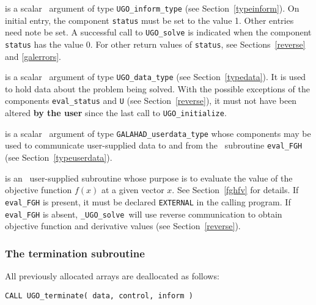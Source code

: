 \documentclass{galahad}
\newcommand{\packagename}{UGO}
\newcommand{\fullpackagename}{\libraryname\_\packagename}
\newcommand{\solver}{{\tt \fullpackagename\_solve}}
\begin{document}
\begin{description}
 is a scalar \intentinout\ argument of type
{\tt \packagename\_inform\_type}
(see Section~\ref{typeinform}).
On initial entry, the  component {\tt status} must be set to the value 1.
Other entries need note be set.
A successful call to
{\tt \packagename\_solve}
is indicated when the  component {\tt status} has the value 0.
For other return values of {\tt status}, see Sections~\ref{reverse} and
\ref{galerrors}.

 is a scalar \intentinout\ argument of type
{\tt \packagename\_data\_type}
(see Section~\ref{typedata}). It is used to hold data about the problem being
solved. With the possible exceptions of the components
{\tt eval\_status} and {\tt U} (see Section~\ref{reverse}),
it must not have been altered {\bf by the user} since the last call to
{\tt \packagename\_initialize}.

 is a scalar \intentinout\ argument of type
{\tt GALAHAD\_userdata\_type} whose components may be used
to communicate user-supplied data to and from the
\optional\ subroutine {\tt eval\_FGH}
(see Section~\ref{typeuserdata}).

 is an \optional\
user-supplied subroutine whose purpose is to evaluate the value of the
objective function $f(x)$ at a given vector $x$.
See Section~\ref{fghfv} for details.
If {\tt eval\_FGH} is present,
it must be declared {\tt EXTERNAL} in the calling program.
If {\tt eval\_FGH} is absent, \solver\ will use reverse communication to
obtain objective function and derivative values (see Section~\ref{reverse}).

\end{description}


\subsubsection{The  termination subroutine}
All previously allocated arrays are deallocated as follows:
\vspace*{1mm}

\hspace{8mm}
{\tt CALL \packagename\_terminate( data, control, inform )}
\end{document}
